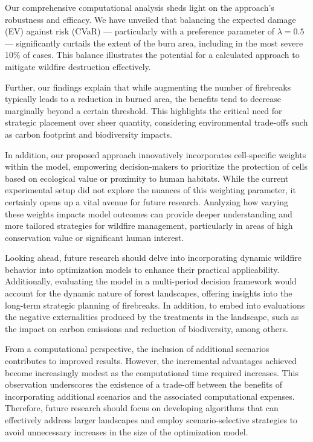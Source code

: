 \documentclass[a4paper,fleqn]{cas-sc}
\begin{document}
Our comprehensive computational analysis sheds light on the approach's robustness and efficacy. We have unveiled that balancing the expected damage (EV) against risk (CVaR) — particularly with a preference parameter of $\lambda=0.5$— significantly curtails the extent of the burn area, including in the most severe 10\% of cases. This balance illustrates the potential for a calculated approach to mitigate wildfire destruction effectively.

Further, our findings explain that while augmenting the number of firebreaks typically leads to a reduction in burned area, the benefits tend to decrease marginally beyond a certain threshold. This highlights the critical need for strategic placement over sheer quantity, considering environmental trade-offs such as carbon footprint and biodiversity impacts.

In addition, our proposed approach innovatively incorporates cell-specific weights within the model, empowering decision-makers to prioritize the protection of cells based on ecological value or proximity to human habitats. While the current experimental setup did not explore the nuances of this weighting parameter, it certainly opens up a vital avenue for future research. Analyzing how varying these weights impacts model outcomes can provide deeper understanding and more tailored strategies for wildfire management, particularly in areas of high conservation value or significant human interest.

Looking ahead, future research should delve into incorporating dynamic wildfire behavior into optimization models to enhance their practical applicability. Additionally, evaluating the model in a multi-period decision framework would account for the dynamic nature of forest landscapes, offering insights into the long-term strategic planning of firebreaks. In addition, to embed into evaluations the negative externalities produced by the treatments in the landscape, such as the impact on carbon emissions and reduction of biodiversity, among others.

From a computational perspective, the inclusion of additional scenarios contributes to improved results. However, the incremental advantages achieved become increasingly modest as the computational time required increases. This observation underscores the existence of a trade-off between the benefits of incorporating additional scenarios and the associated computational expenses. Therefore, future research should focus on developing algorithms that can effectively address larger landscapes and employ scenario-selective strategies to avoid unnecessary increases in the size of the optimization model.
\end{document}
